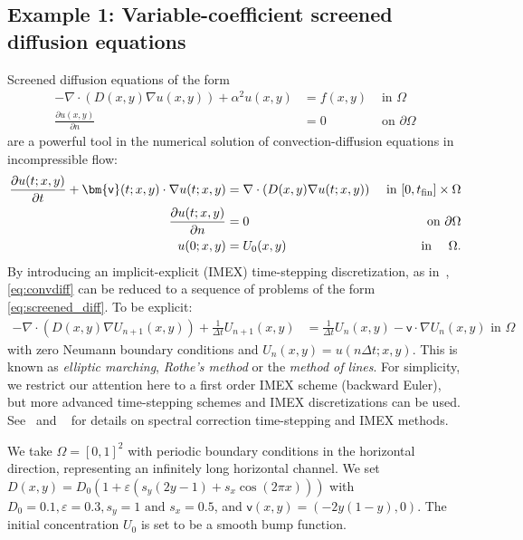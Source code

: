 \documentclass[final,onefignum,onetabnum]{siamart250211}
\newcommand{\vct}[1]{\bm{\mathsf{#1}}}
\theoremstyle{definition}
\begin{document}
\subsection{Example 1: Variable-coefficient screened diffusion equations}\label{sec:convdiff}
Screened diffusion equations of the form
\begin{align}\label{eq:screened_diff}
-\nabla\cdot(D(x,y)\nabla u(x,y)) + \alpha^2u(x,y) &= f(x,y) &\text{ in } \Omega\\
\frac{\partial u(x,y)}{\partial n} &= 0 &\text{ on }\partial\Omega
\end{align}
are a powerful tool in the numerical solution of convection-diffusion equations in incompressible flow:
\begin{align*}
    \frac{\partial u(t;x,y)}{\partial t} + \vct{v}(t;x,y)\cdot\nabla u(t;x,y) &= \nabla\cdot(D(x,y)\nabla u(t;x,y)) & \text{ in }[0,t_{\rm fin}]\times\Omega\\
    \frac{\partial u(t;x,y)}{\partial n} &= 0 & \text{ on }\partial\Omega\\
    u(0;x,y)&=U_0(x,y) & \text{ in } \quad \Omega.
\end{align*}
By introducing an implicit-explicit (IMEX) time-stepping discretization, as in~\cite{FRYKLUND2023111856}, \eqref{eq:convdiff} can be reduced to a sequence of problems of the form \eqref{eq:screened_diff}. To be explicit:
\begin{align}\label{eq:convdiff}
-\nabla\cdot(D(x,y)\nabla U_{n+1}(x,y)) + \frac{1}{\Delta t}U_{n+1}(x,y) &= \frac{1}{\Delta t}U_n(x,y)-\vct{v}\cdot\nabla U_n(x,y) \text{ in } \Omega%
\end{align}
with zero Neumann boundary conditions and $U_{n}(x,y) = u(n\Delta t;x,y)$. This is known as \textit{elliptic marching}, \textit{Rothe's method} or the \textit{method of lines}. For simplicity, we restrict our attention here to a first order IMEX scheme (backward Euler), but more advanced time-stepping schemes and IMEX discretizations can be used. See~\cite{FRYKLUND2023111856} and ~\cite{ARWpaper} for details on spectral correction time-stepping and IMEX methods.

We take $\Omega = [0,1]^2$ with periodic boundary conditions in the horizontal direction, representing an infinitely long horizontal channel. We set $D(x,y) = D_0(1 + \varepsilon(s_y(2y-1) + s_x \cos(2\pi x)))$ with $D_0=0.1,\varepsilon=0.3,s_y=1 \text{ and } s_x=0.5$, and $\vct{v}(x,y)=(-2y(1-y),0)$. The initial concentration $U_0$ is set to be a smooth bump function. 
\end{document}
